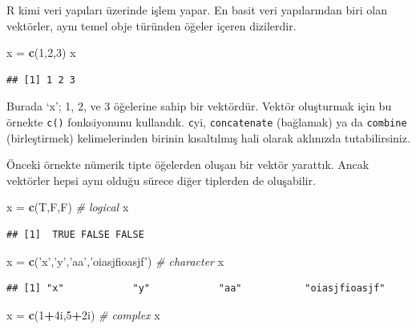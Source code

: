 \documentclass[]{book}
\newenvironment{Shaded}{\begin{snugshade}}{\end{snugshade}}
\newcommand{\CommentTok}[1]{\textcolor[rgb]{0.56,0.35,0.01}{\textit{#1}}}
\newcommand{\DecValTok}[1]{\textcolor[rgb]{0.00,0.00,0.81}{#1}}
\newcommand{\KeywordTok}[1]{\textcolor[rgb]{0.13,0.29,0.53}{\textbf{#1}}}
\newcommand{\NormalTok}[1]{#1}
\newcommand{\OperatorTok}[1]{\textcolor[rgb]{0.81,0.36,0.00}{\textbf{#1}}}
\newcommand{\StringTok}[1]{\textcolor[rgb]{0.31,0.60,0.02}{#1}}
\begin{document}
R kimi veri yapıları üzerinde işlem yapar. En basit veri yapılarından
biri olan vektörler, aynı temel obje türünden öğeler içeren dizilerdir.

\begin{Shaded}
\begin{Highlighting}[]
\NormalTok{x =}\StringTok{ }\KeywordTok{c}\NormalTok{(}\DecValTok{1}\NormalTok{,}\DecValTok{2}\NormalTok{,}\DecValTok{3}\NormalTok{)}
\NormalTok{x}
\end{Highlighting}
\end{Shaded}

\begin{verbatim}
## [1] 1 2 3
\end{verbatim}

Burada `x'; 1, 2, ve 3 öğelerine sahip bir vektördür. Vektör oluşturmak
için bu örnekte \texttt{c()} fonksiyonunu kullandık. \texttt{c}yi,
\texttt{concatenate} (bağlamak) ya da \texttt{combine} (birleştirmek)
kelimelerinden birinin kısaltılmış hali olarak aklınızda tutabilirsiniz.

Önceki örnekte nümerik tipte öğelerden oluşan bir vektör yarattık. Ancak
vektörler hepsi aynı olduğu sürece diğer tiplerden de oluşabilir.

\begin{Shaded}
\begin{Highlighting}[]
\NormalTok{x =}\StringTok{ }\KeywordTok{c}\NormalTok{(T,F,F) }\CommentTok{# logical}
\NormalTok{x}
\end{Highlighting}
\end{Shaded}

\begin{verbatim}
## [1]  TRUE FALSE FALSE
\end{verbatim}

\begin{Shaded}
\begin{Highlighting}[]
\NormalTok{x =}\StringTok{ }\KeywordTok{c}\NormalTok{(}\StringTok{'x'}\NormalTok{,}\StringTok{'y'}\NormalTok{,}\StringTok{'aa'}\NormalTok{,}\StringTok{'oiasjfioasjf'}\NormalTok{) }\CommentTok{# character}
\NormalTok{x}
\end{Highlighting}
\end{Shaded}

\begin{verbatim}
## [1] "x"            "y"            "aa"           "oiasjfioasjf"
\end{verbatim}

\begin{Shaded}
\begin{Highlighting}[]
\NormalTok{x =}\StringTok{ }\KeywordTok{c}\NormalTok{(}\DecValTok{1}\OperatorTok{+}\NormalTok{4i,}\DecValTok{5}\OperatorTok{+}\NormalTok{2i) }\CommentTok{# complex}
\NormalTok{x}
\end{Highlighting}
\end{Shaded}
\end{document}
